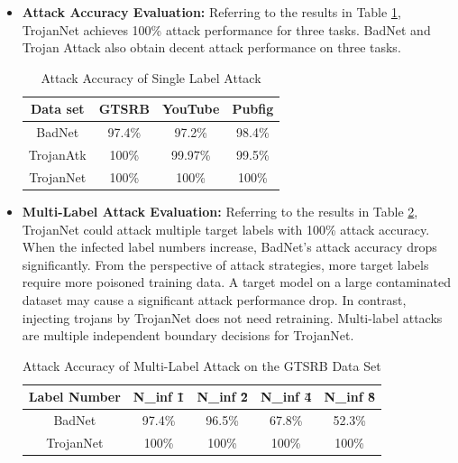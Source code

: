 \documentclass[english,version-2022-01]{uzl-thesis}
\begin{document}
\begin{itemize}
    \item \textbf{Attack Accuracy Evaluation:} Referring to the results in Table \ref{Attack Accuracy of Single Label Attack}, TrojanNet achieves 100\% attack performance for three tasks. BadNet and Trojan Attack also obtain decent attack performance on three tasks.
    \begin{table}[htbp]
    \centering
    \caption{Attack Accuracy of Single Label Attack\cite{tang2020embarrassingly}}
    \begin{tabular}{|c|c|c|c|}
    \hline Data set  &  GTSRB  & YouTube &  Pubfig  \\
    \hline BadNet    & 97.4\%  & 97.2\%  &  98.4\%  \\
    \hline TrojanAtk & 100\%   & 99.97\% &  99.5\%   \\
    \hline TrojanNet & 100\%   & 100\%   &  100\%  \\
    \hline 
    \end{tabular}
    \label{Attack Accuracy of Single Label Attack}
    \end{table}
    \item \textbf{Multi-Label Attack Evaluation:} Referring to the results in Table \ref{Attack Accuracy of Multi-Label Attack on data set GTSRB}, TrojanNet could attack multiple target labels with 100\% attack accuracy. When the infected label numbers increase, BadNet's attack accuracy drops significantly. From the perspective of attack strategies, more target labels require more poisoned training data. A target model on a large contaminated dataset may cause a significant attack performance drop. In contrast, injecting trojans by TrojanNet does not need retraining. Multi-label attacks are multiple independent boundary decisions for TrojanNet.
    \begin{table}[htbp]
    \centering
    \caption{Attack Accuracy of Multi-Label Attack on the GTSRB Data Set\cite{tang2020embarrassingly}}
    \begin{tabular}{|c|c|c|c|c|}
    \hline Label Number  &  N_{inf} \= 1  & N_{inf} \= 2 &  N_{inf} \= 4 & N_{inf} \= 8  \\
    \hline BadNet        & 97.4\%         & 96.5\%       &  67.8\%       & 52.3\%        \\
    \hline TrojanNet     & 100\%          & 100\%        &  100\%        & 100\%         \\
    \hline 
    \end{tabular}
    \label{Attack Accuracy of Multi-Label Attack on data set GTSRB}
    \end{table}
\end{itemize}
\end{document}

